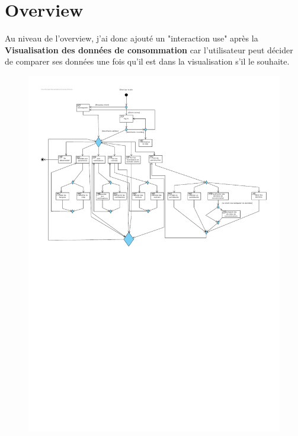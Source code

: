 \section{Overview}

\begin{flushleft}
Au niveau de l'overview, j'ai donc ajouté un "interaction use" après la \textbf{Visualisation des données de consommation} car l'utilisateur peut décider de comparer ses données une fois qu'il est dans la visualisation s'il le souhaite.
\end{flushleft}

\begin{figure}[h]
\centering
\includegraphics[width=1.3\textwidth]{extension-adrien/Overview/img/overview.pdf}
\end{figure}

